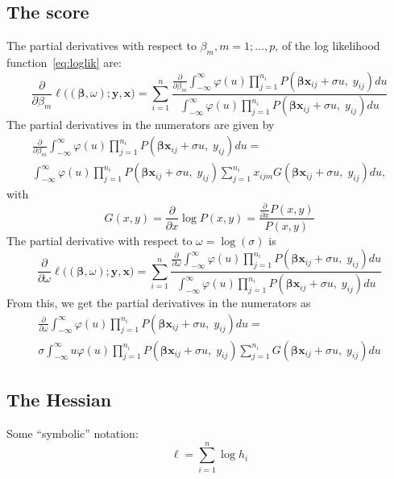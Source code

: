 \documentclass[a4paper,11pt]{article}
\newcommand{\bx}{\ensuremath{\mathbf{x}}}
\newcommand{\by}{\ensuremath{\mathbf{y}}}
\newcommand{\bb}{\ensuremath{\boldsymbol{\beta}}}
\newcommand{\Py}{\ensuremath{P(\bb\bx_{ij} + \sigma u, \; y_{ij})}}
\newcommand{\Gy}{\ensuremath{G(\bb\bx_{ij} + \sigma u, \; y_{ij})}}
\begin{document}
\subsection{The score}
The partial derivatives with respect to $\beta_m, m = 1; \ldots, p$, of the log
likelihood function~\eqref{eq:loglik} are: 
\begin{equation}%
\frac{\partial}{\partial \beta_m} 
\ell\big((\bb, \omega); \by, \bx\big) =
\sum_{i=1}^n  \frac{\frac{\partial}{\partial \beta_m} \int_{-\infty}^{\infty} 
\varphi(u) \prod_{j = 1}^{n_i} \Py  du}
{\int_{-\infty}^{\infty} 
\varphi(u) \prod_{j = 1}^{n_i} \Py  du}
\end{equation}
The partial derivatives in the numerators are given by
\begin{multline}\label{eq:partbeta}
\frac{\partial}{\partial \beta_m} \int_{-\infty}^{\infty} \varphi(u)
\prod_{j = 1}^{n_i} \Py  du = \\
\int_{-\infty}^{\infty} \varphi(u)
\prod_{j = 1}^{n_i} \Py \sum_{j=1}^{n_i}
x_{ijm} \Gy du, 
\end{multline}
with
\begin{equation}
G(x, y) = \frac{\partial}{\partial x} \log P(x, y) = \frac{
\frac{\partial}{\partial x}P(x, y)}{P(x, y)}
\end{equation}
The partial derivative with respect to $\omega = \log(\sigma)$ is
\begin{equation}%
\frac{\partial}{\partial \omega} 
\ell\big((\bb, \omega); \by, \bx\big) =
\sum_{i=1}^n  \frac{
\frac{\partial}{\partial \omega} \int_{-\infty}^{\infty} 
\varphi(u) \prod_{j = 1}^{n_i} \Py  du}
{\int_{-\infty}^{\infty} 
\varphi(u) \prod_{j = 1}^{n_i} \Py  du}
\end{equation}
From this, we get the partial derivatives in the numerators as
\begin{multline}\label{eq:partsigma}
\frac{\partial}{\partial \omega} \int_{-\infty}^{\infty} \varphi(u)
\prod_{j = 1}^{n_i} \Py  du = \\
\sigma \int_{-\infty}^{\infty} u \varphi(u)
\prod_{j = 1}^{n_i} \Py \sum_{j=1}^{n_i}
\Gy du 
\end{multline}

\subsection{The Hessian}

Some ``symbolic'' notation:
\begin{equation}
\ell = \sum_{i=1}^n \log h_i
\end{equation}
\end{document}

